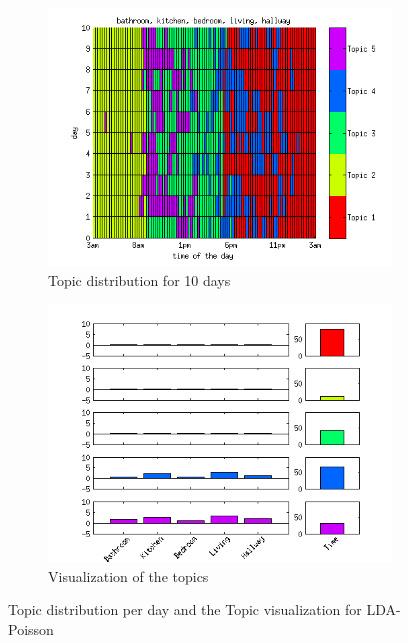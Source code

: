 \documentclass[a4paper,fleqn]{article}
\begin{document}
\begin{figure}[h!]
 \centering
 \begin{subfigure}[b]{0.45\linewidth}
  \centering
  \includegraphics[width=\textwidth]{Pictures/TopDayHN2TS96k5Pois.png}
  \caption{Topic distribution for 10 days}
  \label{fig:PoisDay96}
 \end{subfigure}
 \begin{subfigure}[b]{0.45\linewidth}
  \centering
  \includegraphics[width=\textwidth]{Pictures/TopVisuHN2TS96k5Pois.png}
  \caption{Visualization of the topics}
  \label{fig:PoisTopVisu96}
 \end{subfigure}
 \caption{Topic distribution per day and the Topic visualization for LDA-Poisson}
 \label{fig:Pois96}
\end{figure}
\end{document}

